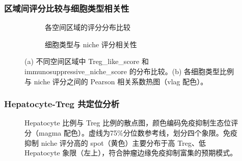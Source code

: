 \documentclass[12pt, a4paper]{ctexart}
\begin{document}
\subsubsection{区域间评分比较与细胞类型相关性}

\begin{figure}[H]
\centering
\begin{subfigure}[b]{0.56\textwidth}
\caption{各空间区域的评分分布比较}
\end{subfigure}
\hfill
\begin{subfigure}[b]{0.4\textwidth}
\caption{细胞类型与 niche 评分相关性}
\end{subfigure}
\caption{(a) 不同空间区域中 Treg\_like\_score 和 immunosuppressive\_niche\_score 的分布比较。(b) 各细胞类型比例与 niche 评分之间的 Pearson 相关系数热图（vlag 配色）。}
\label{fig:score_analysis}
\end{figure}

\subsubsection{Hepatocyte-Treg 共定位分析}

\begin{figure}[H]
\centering
\caption{Hepatocyte 比例与 Treg 比例的散点图，颜色编码免疫抑制生态位评分（magma 配色）。虚线为75\%分位数参考线，划分四个象限。免疫抑制 niche 评分高的 spot（黄色）主要分布于高 Treg、低 Hepatocyte 象限（左上），符合肿瘤边缘免疫抑制富集的预期模式。}
\label{fig:hep_treg_scatter}
\end{figure}
\end{document}
